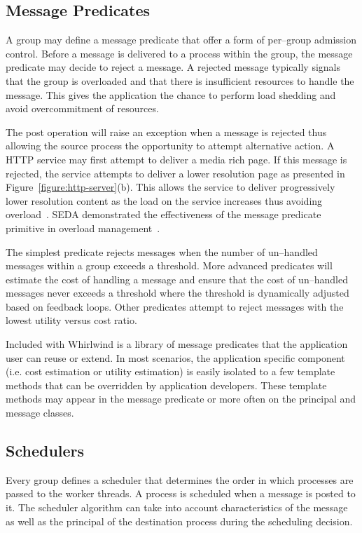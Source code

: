 \documentclass[conference,a4paper,final]{IEEEtran}
\begin{document}
\subsection{Message Predicates}

A group may define a message predicate that offer a form of per--group admission control. Before a message is delivered to a process within the group, the message predicate may decide to reject a message. A rejected message typically signals that the group is overloaded and that there is insufficient resources to handle the message. This gives the application the chance to perform load shedding and avoid overcommitment of resources.

The post operation will raise an exception when a message is rejected thus allowing the source process the opportunity to attempt alternative action. A HTTP service may first attempt to deliver a media rich page. If this message is rejected, the service attempts to deliver a lower resolution page as presented in Figure~\ref{figure:http-server}(b). This allows the service to deliver progressively lower resolution content as the load on the service increases thus avoiding overload~\cite{abdelzaher99web}. SEDA demonstrated the effectiveness of the message predicate primitive in overload management~\cite{welsh03Adaptive}. 

The simplest predicate rejects messages when the number of un--handled messages within a group exceeds a threshold. More advanced predicates will estimate the cost of handling a message and ensure that the cost of un--handled messages never exceeds a threshold where the threshold is dynamically adjusted based on feedback loops. Other predicates attempt to reject messages with the lowest utility versus cost ratio.

Included with Whirlwind is a library of message predicates that the application user can reuse or extend. In most scenarios, the application specific component (i.e. cost estimation or utility estimation) is easily isolated to a few template methods that can be overridden by application developers. These template methods may appear in the message predicate or more often on the principal and message classes.

\subsection{Schedulers}

Every group defines a scheduler that determines the order in which processes are passed to the worker threads. A process is scheduled when a message is posted to it. The scheduler algorithm can take into account characteristics of the message as well as the principal of the destination process during the scheduling decision.
\end{document}
